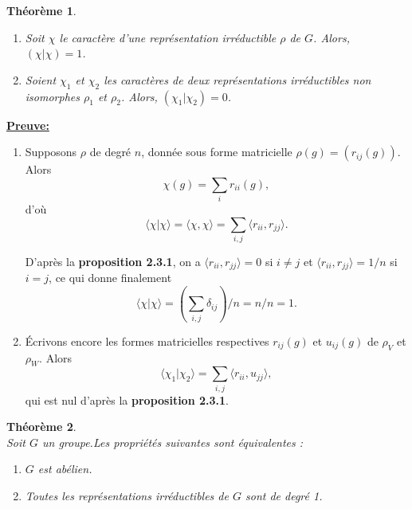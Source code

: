 \documentclass[a4paper, 14pt]{report}
\newtheorem{theorem}{Théorème}[section]
\begin{document}
\begin{onehalfspace}
{			
			\begin{theorem} \cite{serre1971representation}
				\begin{enumerate}[label=\roman*)]
					\item Soit \( \chi \) le caractère d’une représentation irréductible \( \rho \) de \( G \). Alors, \( (\chi | \chi) = 1 \).
					\item Soient \( \chi_1 \) et \( \chi_2 \) les caractères de deux représentations irréductibles non isomorphes \( \rho_1 \) et \( \rho_2 \). Alors, \( (\chi_1 | \chi_2) = 0 \).
				\end{enumerate}
			\end{theorem}
			
			\textbf{\underline{Preuve:}}\\
			\begin{enumerate} [label=\roman*)]
				\item Supposons \( \rho \) de degré \( n \), donnée sous forme matricielle \( \rho(g) = (r_{ij}(g)) \). Alors 
				\[
				\chi(g) = \sum_i r_{ii}(g),
				\]
				d'où 
				\[
				\langle \chi | \chi \rangle = \langle \chi, \chi \rangle = \sum_{i,j} \langle r_{ii}, r_{jj} \rangle.
				\]
				
				D'après la \textbf{ proposition 2.3.1}, on a \( \langle r_{ii}, r_{jj} \rangle = 0 \) si \( i \neq j \) et \( \langle r_{ii}, r_{jj} \rangle = 1/n \) si \( i = j \), ce qui donne finalement 
				\[
				\langle \chi | \chi \rangle = \left( \sum_{i,j} \delta_{ij} \right) / n = n / n = 1.
				\]
				
				\item Écrivons encore les formes matricielles respectives \( r_{ij}(g) \) et \( u_{ij}(g) \) de \( \rho_V \) et \( \rho_W \). Alors 
				\[
				\langle \chi_1 | \chi_2 \rangle = \sum_{i,j} \langle r_{ii}, u_{jj} \rangle,
				\]
				qui est nul d'après la  \textbf{ proposition 2.3.1}.
			\end{enumerate}
			
			
			\begin{theorem}  \cite{serre1971representation} \\
				Soit  \( G \) un groupe.Les propriétés suivantes sont équivalentes :
				\begin{enumerate}
					\item[(i)] \( G \) est abélien.
					\item[(ii)] Toutes les représentations irréductibles de \( G \) sont de degré 1.
				\end{enumerate}
			\end{theorem}
			
}
\end{onehalfspace}
\end{document}
